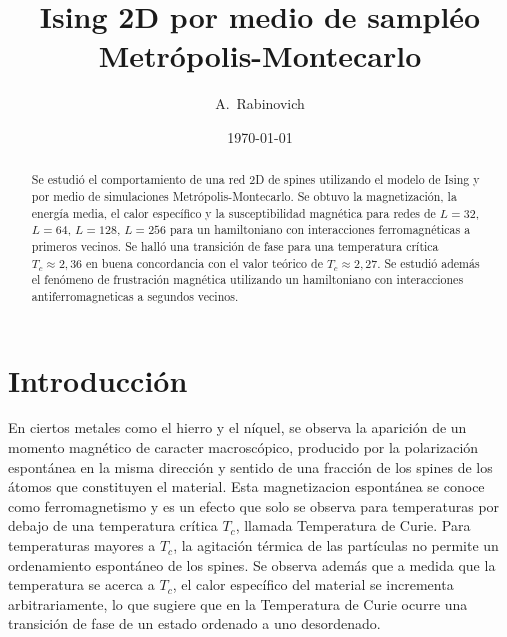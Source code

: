 \documentclass[%
 reprint,
 amsmath,amssymb,
 aps,
spanish]{revtex4-1}
\begin{document}

\title{Ising 2D por medio de sampléo Metrópolis-Montecarlo}%

\author{A.~Rabinovich}
%


\date{\today}%

\begin{abstract}
Se estudió el comportamiento de una red 2D de spines utilizando el modelo de Ising y por medio de simulaciones Metrópolis-Montecarlo. Se obtuvo la magnetización, la energía media, el calor específico 
y la susceptibilidad magnética para redes de $L=32$, $L=64$, $L=128$, $L=256$ para un hamiltoniano con interacciones ferromagnéticas a primeros vecinos. Se halló una transición de fase para 
una temperatura crítica $T_c\approx2,36$ en buena concordancia con el valor teórico de $T_c\approx2,27$.
Se estudió además el fenómeno de frustración magnética utilizando un hamiltoniano con interacciones antiferromagneticas a segundos vecinos.
\end{abstract}

\maketitle



\section{Introducción}
En ciertos metales como el hierro y el níquel, se observa la aparición de un momento magnético de caracter macroscópico, producido por la polarización espontánea en la misma dirección y sentido de 
una fracción 
de los spines de los átomos que constituyen el material. Esta magnetizacion espontánea se conoce como ferromagnetismo y es un efecto que solo se observa para temperaturas por 
debajo de 
una temperatura crítica $T_c$, llamada Temperatura de Curie. Para temperaturas mayores a $T_c$, la agitación térmica de las partículas
no permite un ordenamiento espontáneo de los spines. Se observa además que a medida que la temperatura se acerca a $T_c$, el calor específico del material se incrementa arbitrariamente, lo que 
sugiere que en la Temperatura de Curie ocurre una transición de fase de un estado ordenado a uno desordenado.\cite{huang}
\end{document}
